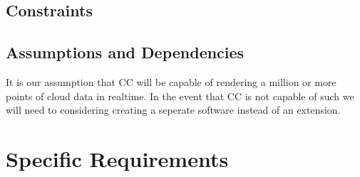 \subsection{Constraints}

\subsection{Assumptions and Dependencies}

It is our assumption that CC will be capable of rendering a million or more points of cloud data in realtime.
In the event that CC is not capable of such we will need to considering creating a seperate software instead of an extension.

\section{Specific Requirements}




